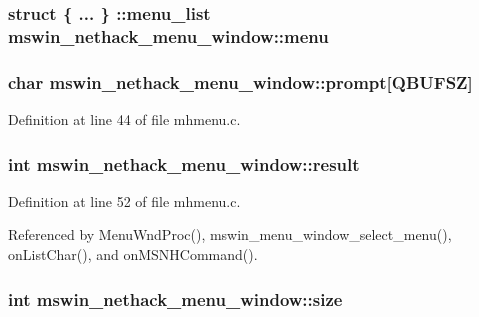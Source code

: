 \hypertarget{structmswin__nethack__menu__window_a519b619005cebb1edd0cd9430e4a0d83}{
\subsubsection[{menu}]{\setlength{\rightskip}{0pt plus 5cm}struct \{ ... \} \+::menu\+\_\+list  mswin\+\_\+nethack\+\_\+menu\+\_\+window\+::menu}}\label{structmswin__nethack__menu__window_a519b619005cebb1edd0cd9430e4a0d83}
\hypertarget{structmswin__nethack__menu__window_a947012a8d256d201c533bb2a9db2e025}{
\subsubsection[{prompt}]{\setlength{\rightskip}{0pt plus 5cm}char mswin\+\_\+nethack\+\_\+menu\+\_\+window\+::prompt\mbox{[}{\bf Q\+B\+U\+F\+S\+Z}\mbox{]}}}\label{structmswin__nethack__menu__window_a947012a8d256d201c533bb2a9db2e025}


Definition at line 44 of file mhmenu.\+c.

\hypertarget{structmswin__nethack__menu__window_a8ec6092e0354a2a0d233634b120e4d78}{
\subsubsection[{result}]{\setlength{\rightskip}{0pt plus 5cm}int mswin\+\_\+nethack\+\_\+menu\+\_\+window\+::result}}\label{structmswin__nethack__menu__window_a8ec6092e0354a2a0d233634b120e4d78}


Definition at line 52 of file mhmenu.\+c.



Referenced by Menu\+Wnd\+Proc(), mswin\+\_\+menu\+\_\+window\+\_\+select\+\_\+menu(), on\+List\+Char(), and on\+M\+S\+N\+H\+Command().

\hypertarget{structmswin__nethack__menu__window_a6ab2f42967e27213b53e9c1326b185b4}{
\subsubsection[{size}]{\setlength{\rightskip}{0pt plus 5cm}int mswin\+\_\+nethack\+\_\+menu\+\_\+window\+::size}}\label{structmswin__nethack__menu__window_a6ab2f42967e27213b53e9c1326b185b4}


